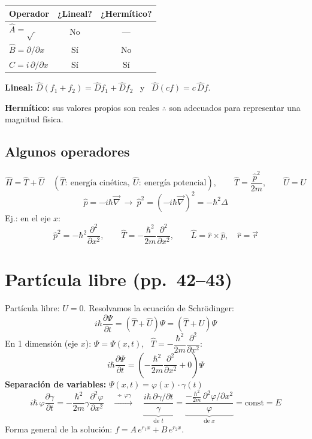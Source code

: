 \documentclass[11pt,a4paper]{article}
\newcommand{\pags}[1]{{\normalfont\small\color{gris}(pp.~#1)}}
\begin{document}
\begin{center}
\begin{tabular}{lcc}
\toprule
Operador & ¿Lineal? & ¿Hermítico?\\
\midrule
$\hat A=\sqrt{\ }$ & No & ---\\
$\hat B=\partial/\partial x$ & Sí & No\\
$\hat C=i\,\partial/\partial x$ & Sí & Sí\\
\bottomrule
\end{tabular}
\end{center}

\textbf{Lineal:} $\hat D(f_1+f_2)=\hat Df_1+\hat Df_2$ \ y \ $\hat D(cf)=c\,\hat Df$.

\textbf{Hermítico:} sus valores propios son reales $\therefore$ son adecuados para representar una magnitud física.

\subsection{Algunos operadores}
\[
\hat H=\hat T+\hat U\quad(\hat T:\ \text{energía cinética},\ \hat U:\ \text{energía potencial}),\qquad
\hat T=\frac{\hat p^2}{2m},\qquad \hat U=U
\]
\[
\hat p=-i\hbar\vec\nabla\ \rightarrow\ \hat p^2=(-i\hbar\vec\nabla)^2=-\hbar^2\Delta
\]
Ej.: en el eje $x$:
\[
\hat p^2=-\hbar^2\frac{\partial^2}{\partial x^2},\qquad
\hat T=-\frac{\hbar^2}{2m}\frac{\partial^2}{\partial x^2},\qquad
\hat L=\hat r\times\hat p,\quad \hat r=\vec r
\]

\section{Partícula libre \pags{42--43}}

Partícula libre: $U=0$. Resolvamos la ecuación de Schrödinger:
\[
i\hbar\frac{\partial\Psi}{\partial t}=(\hat T+\hat U)\Psi=(\hat T+U)\Psi
\]
En 1 dimensión (eje $x$): $\Psi=\Psi(x,t)$, \ $\hat T=-\dfrac{\hbar^2}{2m}\dfrac{\partial^2}{\partial x^2}$:
\[
i\hbar\frac{\partial\Psi}{\partial t}=\left(-\frac{\hbar^2}{2m}\frac{\partial^2}{\partial x^2}+0\right)\Psi
\]
\textbf{Separación de variables:} $\Psi(x,t)=\varphi(x)\cdot\gamma(t)$
\[
i\hbar\,\varphi\frac{\partial\gamma}{\partial t}=-\frac{\hbar^2}{2m}\gamma\frac{\partial^2\varphi}{\partial x^2}
\quad\xrightarrow{\ \div\,\varphi\gamma\ }\quad
\underbrace{\frac{i\hbar\,\partial\gamma/\partial t}{\gamma}}_{\text{de }t}
=\underbrace{\frac{-\frac{\hbar^2}{2m}\,\partial^2\varphi/\partial x^2}{\varphi}}_{\text{de }x}=\text{const}=E
\]
Forma general de la solución: $f=A\,e^{r_1x}+B\,e^{r_2x}$.
\end{document}
